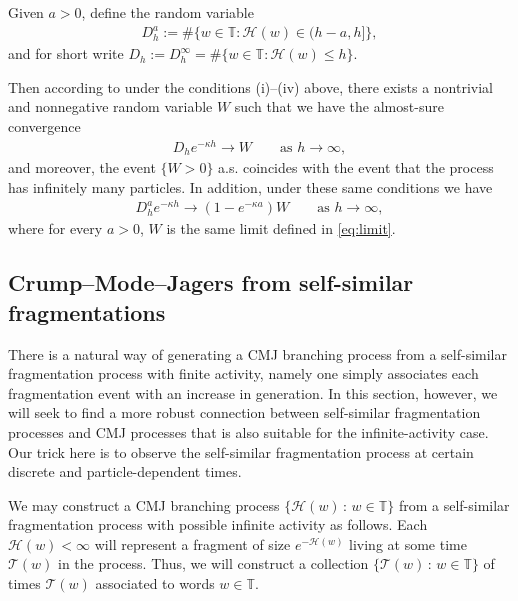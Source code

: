 \documentclass[a4,12pt]{amsart}
\numberwithin{equation}{section}
\begin{document}
\vspace{3mm}
	Given $a > 0$, define the random variable
	\begin{align*}
		D_h^a := \# \{ w \in \mathbb{T} : \mathcal{H}(w) \in (h-a,h] \},
	\end{align*}
	and for short write $D_h := D_h^\infty=\# \{ w \in \mathbb{T} : \mathcal{H}(w) \leq h \}$. 

Then according to \cite{nerman, doney1, doney2} under the conditions (i)--(iv) above, there exists a nontrivial and nonnegative random variable $W$ such that we have the almost-sure convergence
\begin{align} \label{eq:limit}
D_h e^{ - \kappa h} \to W \qquad \text{as $h \to \infty$},
\end{align}
and moreover, the event $\{W > 0\}$ a.s. coincides with the event that the process has infinitely many particles.
In addition, under these same conditions we have 
	\begin{align*} 
D_h^a e^{ - \kappa h} \to (1-e^{-\kappa a} ) W \qquad \text{as $h \to \infty$},
	\end{align*}
    where for every $a > 0$, $W$ is the same limit defined in \eqref{eq:limit}. 

\subsection{Crump--Mode--Jagers from self-similar fragmentations} \label{sec:proj}

	There is a natural way of generating a CMJ branching process from a self-similar 
	fragmentation process with finite activity, namely one simply associates each fragmentation event 
	with an increase in generation. In this section, however, we will seek to find a more robust 
	connection between self-similar fragmentation processes and CMJ processes that is 
	also suitable for the infinite-activity case. Our trick here is to observe the self-similar 
	fragmentation process at certain discrete and particle-dependent times.

	We may construct a CMJ branching process $\{ \mathcal{H}(w) \,:\, w \in \mathbb{T} \}$ 
	from a self-similar fragmentation process with possible infinite activity as follows. Each 
	$\mathcal{H}(w) < \infty$ will represent a fragment of size $e^{ - \mathcal{H}(w)}$ living at some 
	time $\mathcal{T}(w)$ in the process. Thus, we will construct a collection 
	$\{ \mathcal{T}(w) \,:\, w \in \mathbb{T} \}$ of times $\mathcal{T}(w)$ associated to words
	$w \in \mathbb{T}$.
\end{document}
